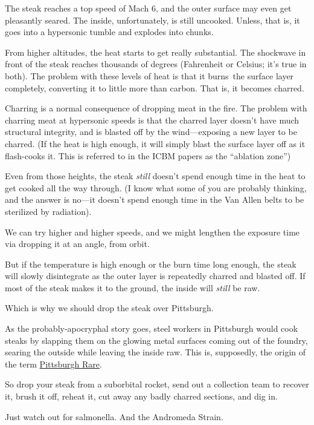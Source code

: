 {The steak reaches a top speed of Mach 6, and the outer surface may even get pleasantly seared. The inside, unfortunately, is still uncooked. Unless, that is, it goes into a hypersonic tumble and explodes into chunks.}

{From higher altitudes, the heat starts to get really substantial. The shockwave in front of the steak reaches thousands of degrees (Fahrenheit or Celsius; it’s true in both). The problem with these levels of heat is that it burns the surface layer completely, converting it to little more than carbon. That is, it becomes charred.}

{Charring is a normal consequence of dropping meat in the fire. The problem with charring meat at hypersonic speeds is that the charred layer doesn’t have much structural integrity, and is blasted off by the wind—exposing a new layer to be charred. (If the heat is high enough, it will simply blast the surface layer off as it flash-cooks it. This is referred to in the ICBM papers as the “ablation zone”)}

{Even from those heights, the steak \emph{still} doesn’t spend enough time in the heat to get cooked all the way through. (I know what some of you are probably thinking, and the answer is no—it doesn’t spend enough time in the Van Allen belts to be sterilized by radiation).}

{We can try higher and higher speeds, and we might lengthen the exposure time via dropping it at an angle, from orbit.}

{But if the temperature is high enough or the burn time long enough, the steak will slowly disintegrate as the outer layer is repeatedly charred and blasted off. If most of the steak makes it to the ground, the inside will \emph{still} be raw.}

{Which is why we should drop the steak over Pittsburgh.}

{As the probably-apocryphal story goes, steel workers in Pittsburgh would cook steaks by slapping them on the glowing metal surfaces coming out of the foundry, searing the outside while leaving the inside raw. This is, supposedly, the origin of the term \href{http://www.livestrong.com/article/436635-how-to-cook-pittsburgh-style-steaks/}{Pittsburgh Rare}.}

{So drop your steak from a suborbital rocket, send out a collection team to recover it, brush it off, reheat it, cut away any badly charred sections, and dig in.}

{Just watch out for salmonella. And the Andromeda Strain.}

